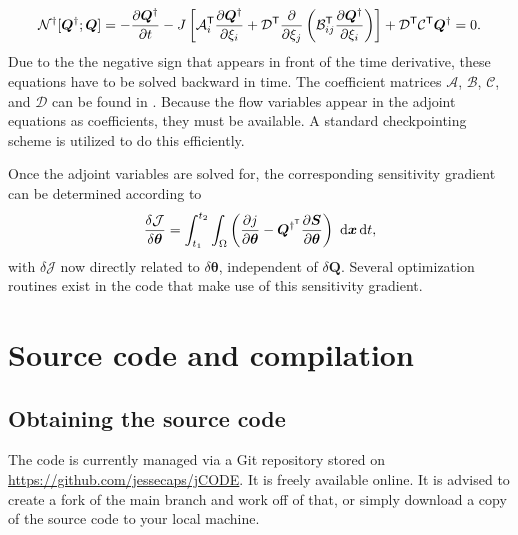 \documentclass[12pt]{article}
\newcommand{\github}{\url{https://github.com/jessecaps/jCODE}}
\begin{document}
\begin{equation}\label{adjEq}
\mathcal{N}^\dagger[\bm{Q}^\dagger;\bm{Q}]=-\frac{\partial \bm{Q}^\dagger}{\partial t}-J\left[\mathcal{A}_i^{\sf T} \frac{\partial \bm{Q}^\dagger}{\partial\xi_i}+\mathcal{D}^{\sf T} \frac{\partial}{\partial\xi_j}\left(\mathcal{B}_{ij}^{\sf T} \frac{\partial \bm{Q}^\dagger}{\partial\xi_i} \right)\right]+\mathcal{D}^{\sf T} \mathcal{C}^{\sf T} \bm{Q}^\dagger = 0.
\end{equation}
Due to the the negative sign that appears in front of the time derivative, these equations have to be solved backward in time. The coefficient matrices $\mathcal{A}$, $\mathcal{B}$, $\mathcal{C}$, and $\mathcal{D}$ can be found in \cite{capecelatro2018adjoint}. Because the flow variables appear in the adjoint equations as coefficients, they must be available. A standard checkpointing scheme is utilized to do this efficiently.

Once the adjoint variables are solved for, the corresponding sensitivity gradient can be determined according to
\begin{equation}\label{gradient}
\frac{\delta\mathcal{J}}{\delta\bm{\theta}}=\int_{t_1}^{t_2}\int_\Omega \left(\frac{\partial j}{\partial \bm{\theta}}-\bm{Q}^{\dagger^{\sf T}}\frac{\partial \bm{S}}{\partial\bm{\theta}}\right)~\text{d}\bm{x}\,\text{d}t,
\end{equation}
with $\delta\mathcal{J}$ now directly related to $\delta \bm{\theta}$, independent of $\delta \bm{Q}$. Several optimization routines exist in the code that make use of this sensitivity gradient.

\section{Source code and compilation}

\subsection{Obtaining the source code \label{sec:source}}
The code is currently managed via a Git repository stored on \github. It is freely available online. It is advised to create a fork of the main branch and work off of that, or simply download a copy of the source code to your local machine.
\end{document}
